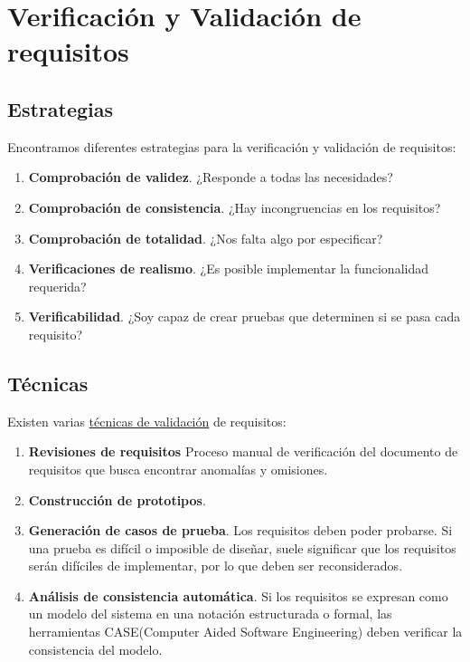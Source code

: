 \section{Verificación y Validación de requisitos}
\subsection{Estrategias}
Encontramos diferentes estrategias para la verificación y validación de requisitos:
\begin{enumerate}
    \item \textbf{Comprobación de validez}. ¿Responde a todas las necesidades?
    \item \textbf{Comprobación de consistencia}. ¿Hay incongruencias en los requisitos? %
    \item \textbf{Comprobación de totalidad}. ¿Nos falta algo por especificar?
    \item \textbf{Verificaciones de realismo}. ¿Es posible implementar la funcionalidad requerida?
    \item \textbf{Verificabilidad}. ¿Soy capaz de crear pruebas que determinen si se pasa cada requisito?
\end{enumerate}

\subsection{Técnicas}
Existen varias \uline{técnicas de validación} de requisitos:

\begin{enumerate}
    \item \textbf{Revisiones de requisitos} Proceso manual de verificación del documento de requisitos que busca encontrar anomalías y omisiones.%
    \item \textbf{Construcción de prototipos}. %
    \item \textbf{Generación de casos de prueba}. Los requisitos deben poder probarse. Si una prueba es difícil o imposible de diseñar, suele significar que los requisitos serán difíciles de implementar, por lo que deben ser reconsiderados.
    \item \textbf{Análisis de consistencia automática}. Si los requisitos se expresan como un modelo del sistema en una notación estructurada o formal, las herramientas CASE(Computer Aided Software Engineering) deben verificar la consistencia del modelo.
\end{enumerate}
